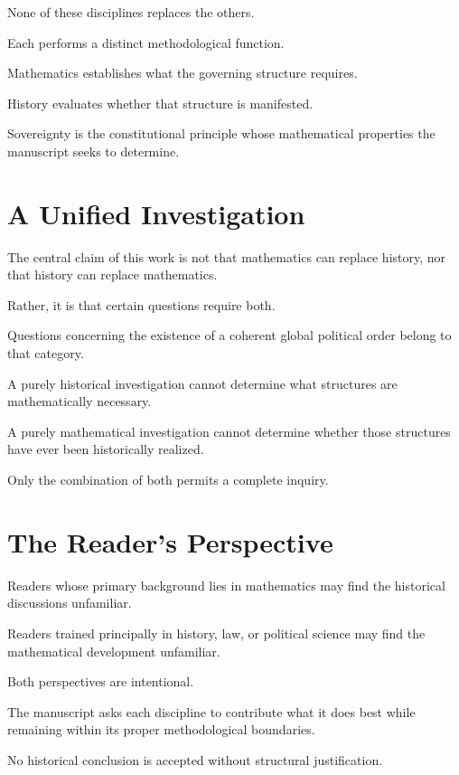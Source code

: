 \documentclass[11pt,openany]{book}
\theoremstyle{plain}
\theoremstyle{definition}
\begin{document}
None of these disciplines replaces the others.

Each performs a distinct methodological function.

Mathematics establishes what the governing structure requires.

History evaluates whether that structure is manifested.

Sovereignty is the constitutional principle whose mathematical properties the manuscript seeks to determine.


\section*{A Unified Investigation}

The central claim of this work is not that mathematics can replace history, nor that history can replace mathematics.

Rather, it is that certain questions require both.

Questions concerning the existence of a coherent global political order belong to that category.

A purely historical investigation cannot determine what structures are mathematically necessary.

A purely mathematical investigation cannot determine whether those structures have ever been historically realized.

Only the combination of both permits a complete inquiry.


\section*{The Reader's Perspective}

Readers whose primary background lies in mathematics may find the historical discussions unfamiliar.

Readers trained principally in history, law, or political science may find the mathematical development unfamiliar.

Both perspectives are intentional.

The manuscript asks each discipline to contribute what it does best while remaining within its proper methodological boundaries.

No historical conclusion is accepted without structural justification.
\end{document}
